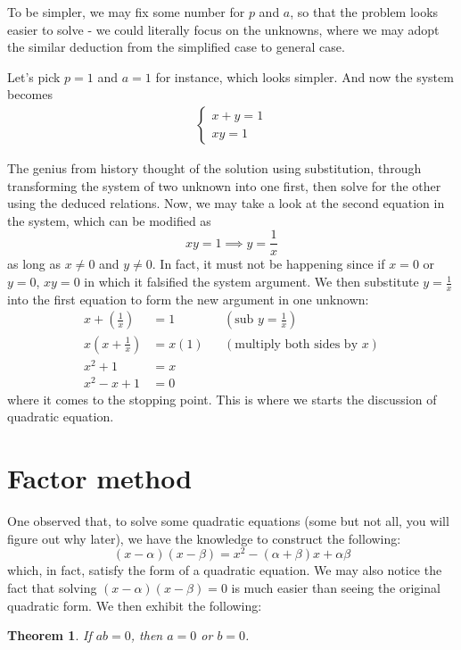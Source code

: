\documentclass[12pt]{article}
\newtheorem*{theorem}{Theorem}
\begin{document}
    To be simpler, we may fix some number for $p$ and $a$, so that the problem looks easier to solve - we could literally focus on the unknowns, where we may adopt the similar deduction from the simplified case to general case.

    Let's pick $p=1$ and $a=1$ for instance, which looks simpler. And now the system becomes
    \begin{align*}
        \begin{cases}
            x+y=1\\xy=1
        \end{cases}
    \end{align*}

    The genius from history thought of the solution using substitution, through transforming the system of two unknown into one first, then solve for the other using the deduced relations. Now, we may take a look at the second equation in the system, which can be modified as $$xy=1\implies y=\frac{1}{x}$$ as long as $x\neq0$ and $y\neq0$. In fact, it must not be happening since if $x=0$ or $y=0$, $xy=0$ in which it falsified the system argument. We then substitute $y=\frac{1}{x}$ into the first equation to form the new argument in one unknown:
    \begin{align*}
        x+(\frac{1}{x})&=1&&(\textrm{sub }y=\frac{1}{x})\\
        x(x+\frac{1}{x})&=x(1)&&(\textrm{multiply both sides by }x)\\
        x^2+1&=x\\
        x^2-x+1&=0
    \end{align*}
    where it comes to the stopping point. This is where we starts the discussion of quadratic equation.

    \section*{Factor method}
    One observed that, to solve some quadratic equations (some but not all, you will figure out why later), we have the knowledge to construct the following: $$(x-\alpha)(x-\beta)=x^2-(\alpha+\beta)x+\alpha\beta$$ which, in fact, satisfy the form of a quadratic equation. We may also notice the fact that solving $(x-\alpha)(x-\beta)=0$ is much easier than seeing the original quadratic form. We then exhibit the following:
    \begin{theorem}
        If $ab=0$, then $a=0$ or $b=0$.
    \end{theorem}
\end{document}
